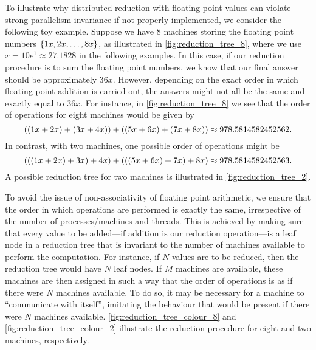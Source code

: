  
To illustrate why distributed reduction with floating point values can violate 
strong parallelism invariance if not properly implemented, we consider the 
following toy example. 
Suppose we have 8 machines storing the floating point numbers $\cbra{1x, 2x, \ldots, 8x}$, 
as illustrated in \cref{fig:reduction_tree_8}, where we use $x = 10 e^1 \approx 27.1828$
in the following examples.
In this case, if our reduction procedure is to sum the floating point numbers, 
we know that our final answer should be approximately $36x$. 
However, depending on the exact order in which floating point addition is carried out, 
the answers might not all be the same and exactly equal to $36x$.
For instance, in \cref{fig:reduction_tree_8} we see that the order of operations 
for eight machines would be given by 
\[
  ((1x + 2x) + (3x + 4x)) + ((5x + 6x) + (7x + 8x)) \\
  \approx 978.5814582452562.
\]
In contrast, with two machines, one possible order of operations might be 
\[
  (((1x + 2x) + 3x) + 4x) + (((5x + 6x) + 7x) + 8x) \\
  \approx 978.5814582452563.
\]
A possible reduction tree for two machines is illustrated in \cref{fig:reduction_tree_2}.

 
To avoid the issue of non-associativity of 
floating point arithmetic, we ensure that the order in which operations are performed 
is exactly the same, irrespective of the number of processes/machines and threads. 
This is achieved by making sure that every value to be added---if addition is our 
reduction operation---is a leaf node in a reduction tree that is invariant to the 
number of machines available to perform the computation. 
For instance, if $N$ values are to be reduced, then the reduction tree would have 
$N$ leaf nodes. If $M$ machines are available, these machines are then assigned 
in such a way that the order of operations is as if there were $N$ machines available. 
To do so, it may be necessary for a machine to ``communicate with itself'', 
imitating the behaviour that would be present if there were $N$ machines available.
\cref{fig:reduction_tree_colour_8} and \cref{fig:reduction_tree_colour_2} 
illustrate the reduction procedure for eight and two machines, respectively.

